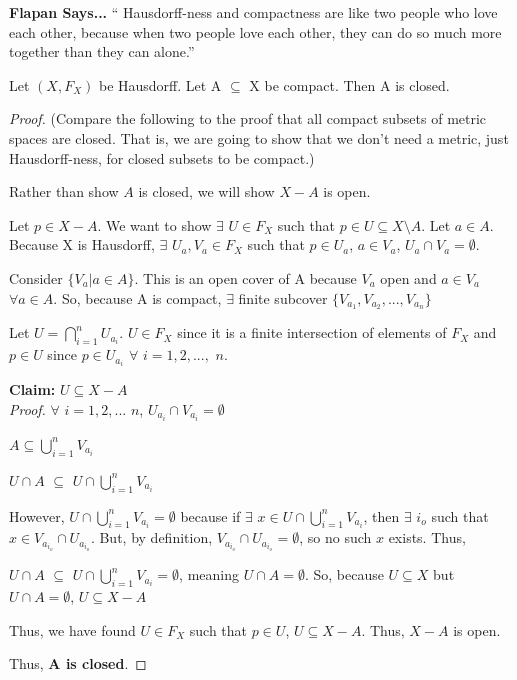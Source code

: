 \textbf{Flapan Says...} `` Hausdorff-ness and compactness are like two people who love each other, because when two people love each other, they can do so much more together than they can alone.'' \\
\begin{theorem}
	Let $(X, F_X)$ be Hausdorff. Let A $\subseteq$ X be compact. Then A is closed. 
\end{theorem}
\begin{proof}
	(Compare the following to the proof that all compact subsets of metric spaces are closed. That is, we are going to show that we don't need a metric, just Hausdorff-ness, for closed subsets to be compact.)
	
	Rather than show $A$ is closed, we will show $X-A$ is open.
	
	Let $p \in X-A$. We want to show $\exists$ $U \in F_X$ such that $p \in U \subseteq X\setminus A$. Let $a \in A$. Because X is Hausdorff, $\exists$ $U_a, V_a \in F_X$ such that $p \in U_a$, $a \in V_a$, $U_a \cap V_a = \emptyset$.
	
	Consider $\{ V_a | a \in A\}$. This is an open cover of A because $V_a$ open and $a \in V_a$ $\forall a \in A$. So, because A is compact, $\exists$ finite subcover $\{ V_{a_1}, V_{a_2}, ..., V_{a_n}\}$
	
	Let $U = \bigcap_{i=1}^{n} U_{a_i}$. $U \in F_X$ since it is a finite intersection of elements of $F_X$ and $p \in U$ since $p \in U_{a_i}$ $\forall$ $i=1, 2, ...,$ $n$.
	
	\textbf{Claim:} $U \subseteq X-A$\\
	\emph{Proof.} $\forall$ $i=1, 2, ...$ $n$, $U_{a_i} \cap V_{a_i} = \emptyset$
	
	$A \subseteq \bigcup_{i=1}^{n} V_{a_i}$
	
	$U \cap A$ $\subseteq$ $U \cap \bigcup_{i=1}^{n} V_{a_i}$
	
	However, $U \cap \bigcup_{i=1}^{n} V_{a_i} = \emptyset$ because if $\exists$ $x \in U \cap \bigcup_{i=1}^{n} V_{a_i}$, then $\exists$ $i_o$ such that $x \in V_{a_{i_o}} \cap U_{a_{i_o}}$. But, by definition, $V_{a_{i_o}} \cap U_{a_{i_o}} = \emptyset$, so no such $x$ exists. Thus,
	
	$U \cap A$ $\subseteq$ $U \cap \bigcup_{i=1}^{n} V_{a_i} = \emptyset$, meaning $U \cap A = \emptyset$. So, because $U \subseteq X$ but $U \cap A = \emptyset$, $U \subseteq X-A$
	
	Thus, we have found $U \in F_X$ such that $p \in U$, $U \subseteq X-A$. Thus, $X-A$ is open.
	
	Thus, \textbf{A is closed}. 
\end{proof}

